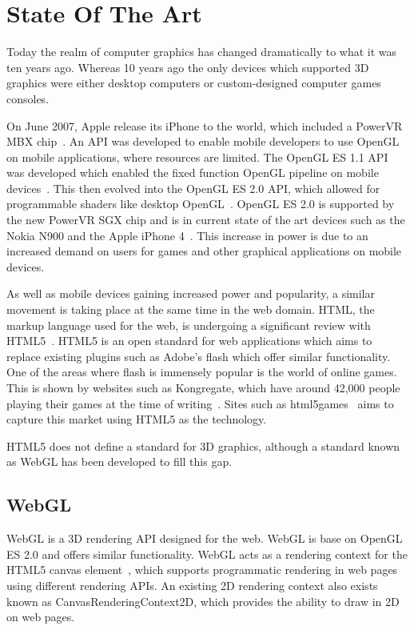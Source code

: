 \chapter{State Of The Art}
\label{ch:stateoftheart}
Today the realm of computer graphics has changed dramatically to what it was ten years ago.
Whereas 10 years ago the only devices which supported 3D graphics were either desktop computers or custom-designed computer games consoles.

On June 2007, Apple release its iPhone to the world, which included a PowerVR MBX chip~\cite{web:powervrmbx}.
An API was developed to enable mobile developers to use OpenGL on mobile applications, where resources are limited.
The OpenGL ES 1.1 API was developed which enabled the fixed function OpenGL pipeline on mobile devices~\cite{web:opengles11}.
This then evolved into the OpenGL ES 2.0 API, which allowed for programmable shaders like desktop OpenGL~\cite{web:opengles20}.
OpenGL ES 2.0 is supported by the new PowerVR SGX chip and is in current state of the art devices such as the Nokia N900 and the Apple iPhone 4~\cite{web:powervrsgx}.
This increase in power is due to an increased demand on users for games and other graphical applications on mobile devices.

As well as mobile devices gaining increased power and popularity, a similar movement is taking place at the same time in the web domain.
HTML, the markup language used for the web, is undergoing a significant review with HTML5~\cite{web:html5}.
HTML5 is an open standard for web applications which aims to replace existing plugins such as Adobe's flash which offer similar functionality.
One of the areas where flash is immensely popular is the world of online games.
This is shown by websites such as Kongregate, which have around 42,000 people playing their games at the time of writing~\cite{web:kongregate}.
Sites such as html5games~\cite{web:html5games} aims to capture this market using HTML5 as the technology.

HTML5 does not define a standard for 3D graphics, although a standard known as WebGL has been developed to fill this gap.

\section{WebGL}
WebGL is a 3D rendering API designed for the web.
WebGL is base on OpenGL ES 2.0 and offers similar functionality.
WebGL acts as a rendering context for the HTML5 canvas element~\cite{web:html5canvas}, which supports programmatic rendering in web pages using different rendering APIs.
An existing 2D rendering context also exists known as CanvasRenderingContext2D, which provides the ability to draw in 2D on web pages.

